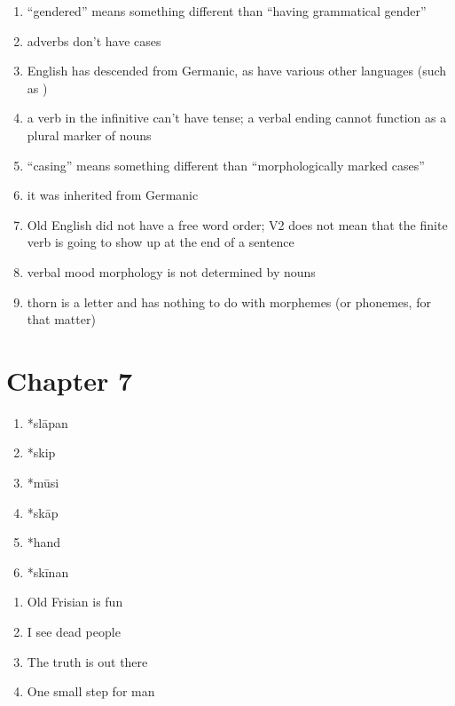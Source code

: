 \noindent\textbf{}

\noindent
\begin{enumerate}
    \item ``gendered'' means something different than ``having grammatical gender''
    \item adverbs don't have cases
    \item English has descended from Germanic, as have various other languages (such as )
    \item a verb in the infinitive can't have tense; a verbal ending cannot function as a plural marker of nouns
    \item ``casing'' means something different than ``morphologically marked cases''
    \item it was inherited from Germanic
    \item Old English did not have a free word order; V2 does not mean that the finite verb is going to show up at the end of a sentence
    \item verbal mood morphology is not determined by nouns
    \item thorn is a letter and has nothing to do with morphemes (or phonemes, for that matter)
\end{enumerate}

\section*{Chapter 7}

\noindent\textbf{}
\begin{multicols}{3}
\begin{enumerate}
    \item *slāpan
    \item *skip
    \item *mūsi
    \item *skāp
    \item *hand
    \item *skīnan
\end{enumerate}
\end{multicols}

\noindent\textbf{}
\begin{multicols}{2}
\begin{enumerate}
    \item Old Frisian is fun
    \item I see dead people
    \item The truth is out there
    \item One small step for man
\end{enumerate}
\end{multicols}

